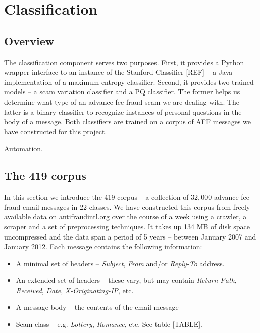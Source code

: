 \chapter{Classification}


\section{Overview}
The classification component serves two purposes. First, it provides a Python wrapper interface to an instance of the Stanford Classifier [REF] -- a Java implementation of a maximum entropy classifier. Second, it provides two trained models -- a scam variation classifier and a PQ classifier. The former helps us determine what type of an advance fee fraud scam we are dealing with. The latter is a binary classifier to recognize instances of personal questions in the body of a message. Both classifiers are trained on a corpus of AFF messages we have constructed for this project.

Automation.



\section{The 419 corpus}
In this section we introduce the 419 corpus -- a collection of $32,000$ advance fee fraud email messages in 22 classes. We have constructed this corpus from freely available data on antifraudintl.org over the course of a week using a crawler, a scraper and a set of preprocessing techniques. It takes up 134 MB of disk space uncompressed and the data span a period of 5 years -- between January 2007 and January 2012.  Each message contains the following information:
	\begin{itemize}
	\item A minimal set of headers -- \emph{Subject}, \emph{From} and/or \emph{Reply-To} address.
	\item An extended set of headers -- these vary, but may contain \emph{Return-Path}, \emph{Received}, \emph{Date}, \emph{X-Originating-IP}, etc.
	\item A message body -- the contents of the email message
	\item Scam class -- e.g. \emph{Lottery}, \emph{Romance}, etc. See table [TABLE].
	\end{itemize}


